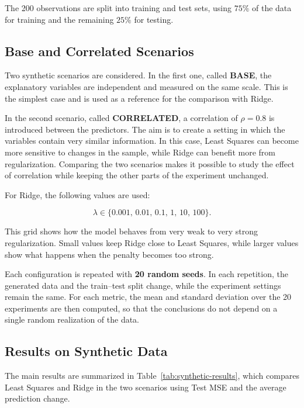 \documentclass[11pt,a4paper]{article}
\begin{document}
The 200 observations are split into training and test sets, using $75\%$ of the data for training and the remaining $25\%$ for testing.

\subsection{Base and Correlated Scenarios}

Two synthetic scenarios are considered. In the first one, called \textbf{BASE}, the explanatory variables are independent and measured on the same scale. This is the simplest case and is used as a reference for the comparison with Ridge.

In the second scenario, called \textbf{CORRELATED}, a correlation of $\rho=0.8$ is introduced between the predictors. The aim is to create a setting in which the variables contain very similar information. In this case, Least Squares can become more sensitive to changes in the sample, while Ridge can benefit more from regularization. Comparing the two scenarios makes it possible to study the effect of correlation while keeping the other parts of the experiment unchanged.

For Ridge, the following values are used:

\begin{equation}
    \lambda \in \{0.001,\,0.01,\,0.1,\,1,\,10,\,100\}.
\end{equation}

This grid shows how the model behaves from very weak to very strong regularization. Small values keep Ridge close to Least Squares, while larger values show what happens when the penalty becomes too strong.

Each configuration is repeated with \textbf{20 random seeds}. In each repetition, the generated data and the train--test split change, while the experiment settings remain the same. For each metric, the mean and standard deviation over the 20 experiments are then computed, so that the conclusions do not depend on a single random realization of the data.

\subsection{Results on Synthetic Data}

The main results are summarized in Table~\ref{tab:synthetic-results}, which compares Least Squares and Ridge in the two scenarios using Test MSE and the average prediction change.
\end{document}
